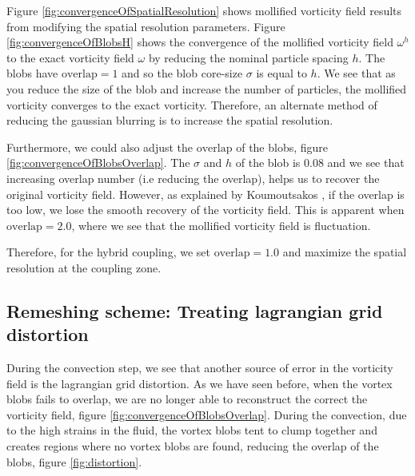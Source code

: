 Figure \ref{fig:convergenceOfSpatialResolution} shows mollified vorticity field results from modifying the spatial resolution parameters. Figure \ref{fig:convergenceOfBlobsH} shows the convergence of the mollified vorticity field $\omega^h$ to the exact vorticity field $\omega$ by reducing the nominal particle spacing $h$. The blobs have $\mathrm{overlap} = 1$ and so the blob core-size $\sigma$ is equal to $h$. We see that as you reduce the size of the blob and increase the number of particles, the mollified vorticity converges to the exact vorticity. Therefore, an alternate method of reducing the gaussian blurring is to increase the spatial resolution.

Furthermore, we could also adjust the $\mathrm{overlap}$ of the blobs, figure \ref{fig:convergenceOfBlobsOverlap}. The $\sigma$ and $h$ of the blob is $0.08$ and we see that increasing overlap number (i.e reducing the overlap), helps us to recover the original vorticity field. However, as explained by Koumoutsakos \cite{Cottet2000a}, if the overlap is too low, we lose the smooth recovery of the vorticity field. This is apparent when $\mathrm{overlap} = 2.0$, where we see that the mollified vorticity field is fluctuation.

Therefore, for the hybrid coupling, we set $\mathrm{overlap} = 1.0$ and maximize the spatial resolution at the coupling zone. 

\subsection{Remeshing scheme: Treating lagrangian grid distortion}
\label{subsec:remeshing}
%

During the convection step, we see that another source of error in the vorticity field is the lagrangian grid distortion. As we have seen before, when the vortex blobs fails to overlap, we are no longer able to reconstruct the correct the vorticity field, figure \ref{fig:convergenceOfBlobsOverlap}. During the convection, due to the high strains in the fluid, the vortex blobs tent to clump together and creates regions where no vortex blobs are found, reducing the overlap of the blobs, figure \ref{fig:distortion}. 

